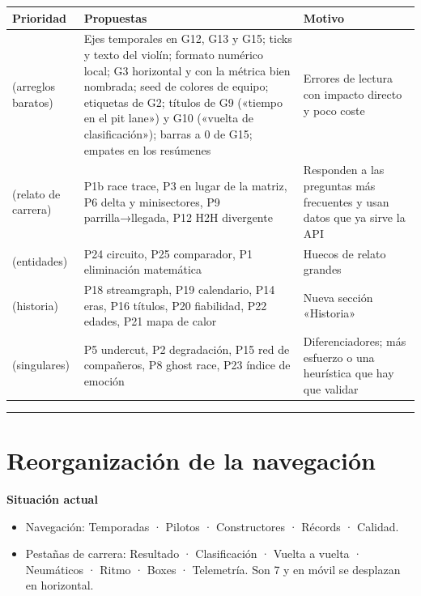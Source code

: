 {\small\sloppy\setlength{\tabcolsep}{5pt}\renewcommand{\arraystretch}{1.15}
\begin{longtable}{@{}>{\raggedright\arraybackslash}p{0.170\dimexpr(\linewidth-30pt)\relax}>{\raggedright\arraybackslash}p{0.415\dimexpr(\linewidth-30pt)\relax}>{\raggedright\arraybackslash}p{0.415\dimexpr(\linewidth-30pt)\relax}@{}}
\toprule
\textbf{Prioridad} & \textbf{Propuestas} & \textbf{Motivo} \\
\midrule\endhead
\bottomrule\endlastfoot
1 (arreglos baratos) & Ejes temporales en G12, G13 y G15; ticks y texto del violín; formato numérico local; G3 horizontal y con la métrica bien nombrada; seed de colores de equipo; etiquetas de G2; títulos de G9 («tiempo en el pit lane») y G10 («vuelta de clasificación»); barras a 0 de G15; empates en los resúmenes & Errores de lectura con impacto directo y poco coste \\
2 (relato de carrera) & P1b race trace, P3 en lugar de la matriz, P6 delta y minisectores, P9 parrilla→llegada, P12 H2H divergente & Responden a las preguntas más frecuentes y usan datos que ya sirve la API \\
3 (entidades) & P24 circuito, P25 comparador, P1 eliminación matemática & Huecos de relato grandes \\
4 (historia) & P18 streamgraph, P19 calendario, P14 eras, P16 títulos, P20 fiabilidad, P22 edades, P21 mapa de calor & Nueva sección «Historia» \\
5 (singulares) & P5 undercut, P2 degradación, P15 red de compañeros, P8 ghost race, P23 índice de emoción & Diferenciadores; más esfuerzo o una heurística que hay que validar \\
\end{longtable}}

\medskip\noindent\textcolor{muted!40}{\rule{\linewidth}{0.3pt}}\medskip

\section{Reorganización de la navegación}

\textbf{Situación actual}

\begin{itemize}
\item Navegación: Temporadas · Pilotos · Constructores · Récords · Calidad.
\item Pestañas de carrera: Resultado · Clasificación · Vuelta a vuelta · Neumáticos · Ritmo · Boxes · Telemetría. Son 7 y en móvil se desplazan en horizontal.
\end{itemize}

